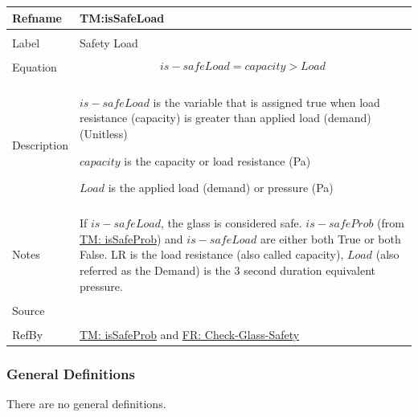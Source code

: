 \documentclass[12pt]{article}
\begin{document}
\noindent \begin{minipage}{\textwidth}
          \begin{tabular}{>{\raggedright}p{}>{\raggedright\arraybackslash}p{}}
          \toprule \textbf{Refname} & \textbf{TM:isSafeLoad}
          \label{TM:isSafeLoad}
          \\ \midrule \\
          Label & Safety Load
          \\ \midrule \\
          Equation & \begin{displaymath}
                     is-safeLoad=capacity>Load
                     \end{displaymath}
          \\ \midrule \\
          Description & \begin{symbDescription}
                        \item{$is-safeLoad$ is the variable that is assigned true when load resistance (capacity) is greater than applied load (demand) (Unitless)}
                        \item{$capacity$ is the capacity or load resistance (Pa)}
                        \item{$Load$ is the applied load (demand) or pressure (Pa)}
                        \end{symbDescription}
          \\ \midrule \\
          Notes & If $is-safeLoad$, the glass is considered safe. $is-safeProb$ (from \hyperref[TM:isSafeProb]{TM: isSafeProb}) and $is-safeLoad$ are either both True or both False. LR is the load resistance (also called capacity), $Load$ (also referred as the Demand) is the 3 second duration equivalent pressure.
          \\ \midrule \\
          Source & \cite{astm2009}
          \\ \midrule \\
          RefBy & \hyperref[TM:isSafeProb]{TM: isSafeProb} and \hyperref[checkGlassSafety]{FR: Check-Glass-Safety}
          \\ \bottomrule
          \end{tabular}
          \end{minipage}
\subsubsection{General Definitions}
\label{Sec:GDs}
There are no general definitions.
\end{document}
